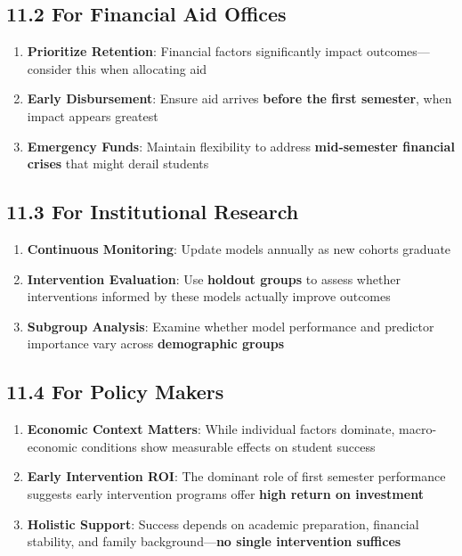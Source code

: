 \documentclass[
]{article}
\providecommand{\tightlist}{%
  \setlength{\itemsep}{0pt}\setlength{\parskip}{0pt}}
\begin{document}
\subsection{11.2 For Financial Aid
Offices}\label{for-financial-aid-offices}

\begin{enumerate}
\def\labelenumi{\arabic{enumi}.}
\tightlist
\item
  \textbf{Prioritize Retention}: Financial factors significantly impact
  outcomes---consider this when allocating aid
\item
  \textbf{Early Disbursement}: Ensure aid arrives \textbf{before the
  first semester}, when impact appears greatest
\item
  \textbf{Emergency Funds}: Maintain flexibility to address
  \textbf{mid-semester financial crises} that might derail students
\end{enumerate}

\subsection{11.3 For Institutional
Research}\label{for-institutional-research}

\begin{enumerate}
\def\labelenumi{\arabic{enumi}.}
\tightlist
\item
  \textbf{Continuous Monitoring}: Update models annually as new cohorts
  graduate
\item
  \textbf{Intervention Evaluation}: Use \textbf{holdout groups} to
  assess whether interventions informed by these models actually improve
  outcomes
\item
  \textbf{Subgroup Analysis}: Examine whether model performance and
  predictor importance vary across \textbf{demographic groups}
\end{enumerate}

\subsection{11.4 For Policy Makers}\label{for-policy-makers}

\begin{enumerate}
\def\labelenumi{\arabic{enumi}.}
\tightlist
\item
  \textbf{Economic Context Matters}: While individual factors dominate,
  macro-economic conditions show measurable effects on student success
\item
  \textbf{Early Intervention ROI}: The dominant role of first semester
  performance suggests early intervention programs offer \textbf{high
  return on investment}
\item
  \textbf{Holistic Support}: Success depends on academic preparation,
  financial stability, and family background---\textbf{no single
  intervention suffices}
\end{enumerate}
\end{document}
